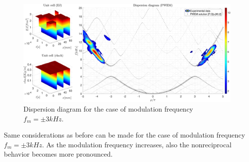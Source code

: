 \begin{figure}[H]
    \centering
    \includegraphics[width=\textwidth]{img/MATLAB/PWEM_EXP Sinusoidal (discrete) @3kHz.pdf}
    \caption{Dispersion diagram for the case of modulation frequency $f_m = \pm 3 kHz$.}
    \label{fig:PWEM_EXP_Sinusoidal_(discrete)_@3kHz}
\end{figure}

Same considerations as before can be made for the case of modulation frequency $f_m = \pm 3 kHz$.
As the modulation frequency increases, also the nonreciprocal behavior becomes more pronounced.


